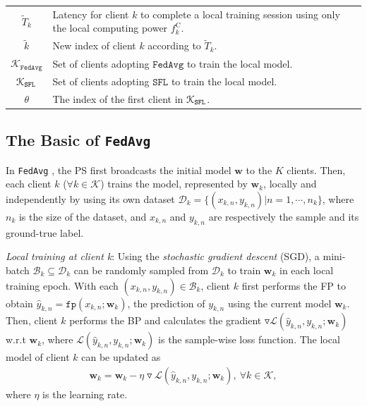 \documentclass[10pt,journal,transmag]{IEEEtran}
\begin{document}
\begin{table}[!htbp]
\begin{center}
\begin{tabular}{cp{2.54in}}
        $\tilde{T}_k$ & Latency for client $k$ to complete a local training session using only the local computing power $f_k^\text{C}$. \\
        
        $\tilde{k}$ & New index of client $k$ according to $\tilde{T}_k$. \\
        
        $\mathcal{K}_\texttt{FedAvg}$ & Set of clients adopting $\texttt{FedAvg}$ to train the local model.\\
        
        $\mathcal{K}_\text{\texttt{SFL}}$ & Set of clients adopting $\texttt{SFL}$ to train the local model.\\
        
        $\theta$ & The index of the first client in $\mathcal{K}_\text{\texttt{SFL}}$. \\

        \bottomrule
    \end{tabular}
\end{center}
\end{table}

\subsection{The Basic of \texttt{FedAvg}}
In \texttt{FedAvg} \cite{McMahan2017CommunicationEfficientLO}, the PS first broadcasts the initial model $\textbf{w}$ to the $K$ clients. Then, each client $k$ ($\forall k \in \mathcal{K}$) trains the model, represented by $\textbf{w}_k$, locally and independently by using its own dataset $\mathcal{D}_k = \{\left(x_{k,n}, y_{k,n}\right)| n = {1, \cdots, n_k}\}$, where $n_k$ is the size of the dataset, and $x_{k,n}$ and $y_{k,n}$ are respectively the sample and its ground-true label.

\textit{Local training at client k}: Using the \textit{stochastic gradient descent} (SGD), a mini-batch $\mathcal{B}_k\subseteq \mathcal{D}_k$ can be randomly sampled from $\mathcal{D}_k$ to train $\textbf{w}_k$ in each local training epoch. With each $(x_{k,n}, y_{k,n}) \in \mathcal{B}_k$, client $k$ first performs the FP to obtain $\hat{y}_{k,n}=\texttt{fp}(x_{k,n};\textbf{w}_k)$, the prediction of $y_{k,n}$ using the current model $\textbf{w}_k$. 
Then, client $k$ performs the BP and calculates the gradient $\triangledown \mathcal{L}(\hat{y}_{k,n}, y_{k,n}; \textbf{w}_k)$ w.r.t $\textbf{w}_k$, where $\mathcal{L}(\hat{y}_{k,n}, y_{k,n}; \textbf{w}_k)$ is the sample-wise loss function. The local model of client $k$ can be updated as
\begin{align}
    \textbf{w}_k = \textbf{w}_k - \eta \triangledown \mathcal{L}(\hat{y}_{k,n}, y_{k,n}; \textbf{w}_k),\ \forall k \in \mathcal{K},
\end{align}
where $\eta$ is the learning rate.
\end{document}
